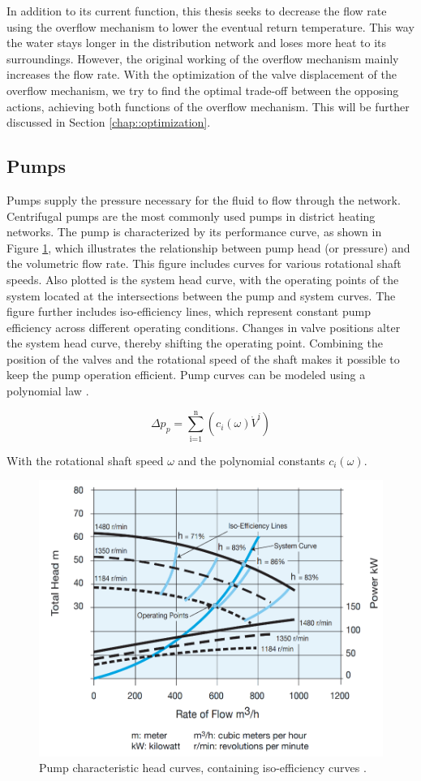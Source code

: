 In addition to its current function, this thesis seeks to decrease the flow rate using the overflow mechanism to lower the eventual return temperature. This way the water stays longer in the distribution network and loses more heat to its surroundings. However, the original working of the overflow mechanism mainly increases the flow rate. With the optimization of the valve displacement of the overflow mechanism, we try to find the optimal trade-off between the opposing actions, achieving both functions of the overflow mechanism. This will be further discussed in Section \ref{chap::optimization}.

\subsection{Pumps}
Pumps supply the pressure necessary for the fluid to flow through the network. Centrifugal pumps are the most commonly used pumps in district heating networks. The pump is characterized by its performance curve, as shown in Figure \ref{fig::pumpcharacteristic}, which illustrates the relationship between pump head (or pressure) and the volumetric flow rate. This figure includes curves for various rotational shaft speeds. Also plotted is the system head curve, with the operating points of the system located at the intersections between the pump and system curves. The figure further includes iso-efficiency lines, which represent constant pump efficiency across different operating conditions. Changes in valve positions alter the system head curve, thereby shifting the operating point. Combining the position of the valves and the rotational speed of the shaft makes it possible to keep the pump operation efficient. Pump curves can be modeled using a polynomial law \cite{echtephdthesis}. 

\begin{equation}\label{eq::pumpchar}
    \Delta p_{p} = \sum^{\text{n}}_{\text{i=1}} \left( c_i(\omega)  \dot{V}^{i} \right)
\end{equation}

With the rotational shaft speed $\omega$ and the polynomial constants $c_i(\omega)$. 

\begin{figure}[h!]
    \centering
    \includegraphics[width=0.6\linewidth]{Literature Survey - DCSC template/figuresLIT/pumpgoed.png}
    \caption{Pump characteristic head curves, containing iso-efficiency curves \cite{pumpcharacteristics}.}
    \label{fig::pumpcharacteristic}
\end{figure}

